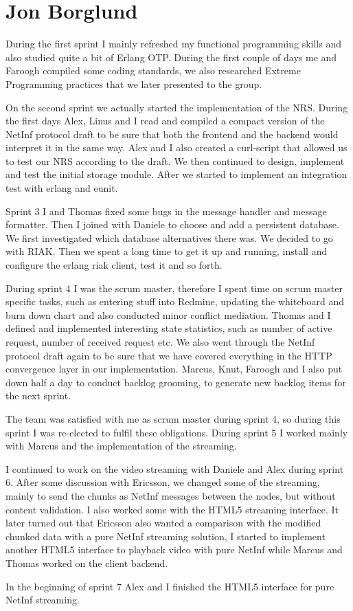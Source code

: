 \section{Jon Borglund}
During the first sprint I mainly refreshed my functional programming skills and also studied quite a bit of Erlang OTP.
During the first couple of days me and Faroogh compiled some coding standards, we also researched Extreme Programming practices that we later presented to the group.

On the second sprint we actually started the implementation of the NRS. During the first days Alex, Linus and I read and compiled a compact version of the NetInf protocol draft to be sure that both the frontend and the backend would interpret it in the same way. Alex and I also created a curl-script that allowed us to test our NRS according to the draft. 
We then continued to design, implement and test the initial storage module. 
After we started to implement an integration test with erlang and eunit.

Sprint 3 I and Thomas fixed some bugs in the message handler and message formatter. Then I joined with Daniele to choose and add a persistent database. We first investigated which database alternatives there was. We decided to go with RIAK. Then we spent a long time to get it up and running, install and configure the erlang riak client, test it and so forth.

During sprint 4 I was the scrum master, therefore I spent time on scrum master specific tasks, such as entering stuff into Redmine, updating the whiteboard and burn down chart and also conducted minor conflict mediation. 
Thomas and I defined and implemented interesting state statistics, such as number of active request, number of received request etc. We also went through the NetInf protocol draft again to be sure that we have covered everything in the HTTP convergence layer in our implementation.  Marcus, Knut, Faroogh and I also put down half a day to conduct backlog grooming, to generate new backlog items for the next sprint. 

The team was satisfied with me as scrum master during sprint 4, so during this sprint I was re-elected to fulfil these obligations. 
During sprint 5 I worked mainly with Marcus and the implementation of the streaming. 

I continued to work on the video streaming with Daniele and Alex during sprint 6. After some discussion with Ericsson, we changed some of the streaming, mainly to send the chunks as NetInf messages between the nodes, but without content validation. I also worked some with the HTML5 streaming interface. 
It later turned out that Ericsson also wanted a comparison with the modified chunked data with a pure NetInf streaming solution, I started to implement another HTML5 interface to playback video with pure NetInf while Marcus and Thomas worked on the client backend.

In the beginning of sprint 7 Alex and I finished the HTML5 interface for pure NetInf streaming.